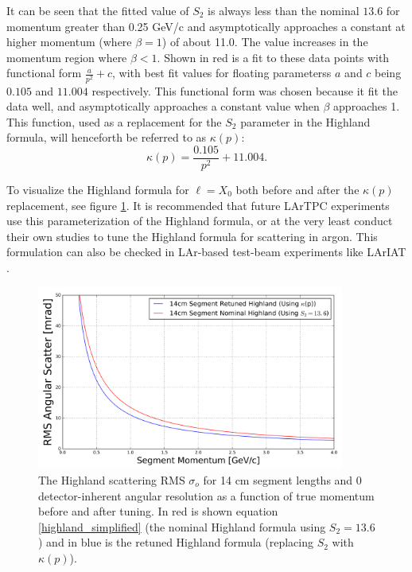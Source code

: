 \documentclass[a4paper,11pt]{article}
\begin{document}
It can be seen that the fitted value of $S_2$ is always less than the nominal $13.6$ for momentum greater than 0.25 GeV/c and asymptotically approaches a constant at higher momentum (where $\beta = 1$) of about 11.0. The value increases in the momentum region where $\beta < 1$. Shown in red is a fit to these data points with functional form $\frac{a}{p^2} + c$, with best fit values for floating parameterss $a$ and $c$ being $0.105$ and $11.004$ respectively. This functional form was chosen because it fit the data well, and asymptotically approaches a constant value when $\beta$ approaches 1. This function, used as a replacement for the $S_2$ parameter in the Highland formula, will henceforth be referred to as $\kappa(p)$:
\begin{equation}\label{kappa_equation}
\kappa(p) = \frac{0.105}{p^2} + 11.004.
\end{equation}

To visualize the Highland formula for ${\ell} = X_0$ both before and after the $\kappa(p)$ replacement, see figure \ref{retune_highland_fig2}. It is recommended that future LArTPC experiments use this parameterization of the Highland formula, or at the very least conduct their own studies to tune the Highland formula for scattering in argon. This formulation can also be checked in LAr-based test-beam experiments like LArIAT \cite{LARIAT_citation}.\\

\begin{figure}[ht!]
\begin{center}
\includegraphics[width=0.9\textwidth]{Figures/highland_formula_visualized_twoforms.png}
\end{center}
\caption{The Highland scattering RMS $\sigma_o$ for 14 cm segment lengths and 0 detector-inherent angular resolution as a function of true momentum before and after tuning. In red is shown equation \ref{highland_simplified} (the nominal Highland formula using $S_2 = 13.6$) and in blue is the retuned Highland formula (replacing $S_2$ with $\kappa(p)$).}
\label{retune_highland_fig2}
\end{figure}
\end{document}
